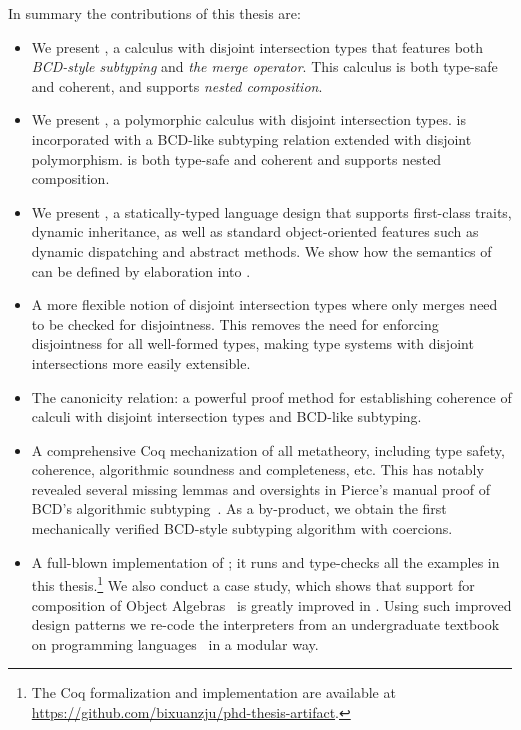 In summary the contributions of this thesis are:

\begin{itemize}

\item We present \namee, a calculus with disjoint intersection types that
  features both \emph{BCD-style subtyping} and \emph{the merge operator}. This
  calculus is both type-safe and coherent, and supports \emph{nested composition}.

\item We present \fnamee, a polymorphic calculus with disjoint intersection
  types. \fnamee is incorporated with a BCD-like subtyping relation extended
  with disjoint polymorphism. \fnamee is both type-safe and coherent and
  supports nested composition.

\item We present \sedel, a statically-typed language design that supports
  first-class traits, dynamic inheritance, as well as standard object-oriented
  features such as dynamic dispatching and abstract methods. We show how the
  semantics of \sedel can be defined by elaboration into \fnamee.

\item A more flexible notion of disjoint intersection types where only merges
  need to be checked for disjointness. This removes the need for enforcing
  disjointness for all well-formed types, making type systems with disjoint
  intersections more easily extensible.

\item The canonicity relation: a powerful proof method for establishing
  coherence of calculi with disjoint intersection types and BCD-like subtyping.

\item A comprehensive Coq mechanization of all metatheory, including type
  safety, coherence, algorithmic soundness and completeness, etc. This has
  notably revealed several missing lemmas and oversights in Pierce's manual
  proof of BCD's algorithmic subtyping~\citep{pierce1989decision}. As a
  by-product, we obtain the first mechanically verified BCD-style subtyping
  algorithm with coercions.

\item A full-blown implementation of \sedel; it runs and type-checks all the
  examples in this thesis.\footnote{The Coq formalization and implementation are
    available at \url{https://github.com/bixuanzju/phd-thesis-artifact}.} We also conduct a case study,
  which shows that support for composition of Object
  Algebras~\citep{oliveira2012extensibility} is greatly
  improved in \sedel. Using such improved design patterns we re-code the
  interpreters from an undergraduate textbook on programming
  languages~\citep{poplcook} in a modular way.

\end{itemize}


